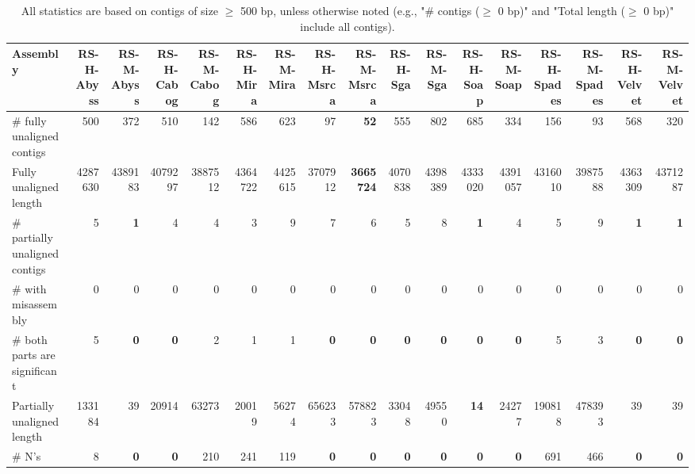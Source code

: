 \documentclass[12pt,a4paper]{article}
\begin{document}
\begin{table}[ht]
\begin{center}
\caption{All statistics are based on contigs of size $\geq$ 500 bp, unless otherwise noted (e.g., "\# contigs ($\geq$ 0 bp)" and "Total length ($\geq$ 0 bp)" include all contigs).}
\begin{tabular}{|l*{16}{|r}|}
\hline
Assembly & RS-H-Abyss & RS-M-Abyss & RS-H-Cabog & RS-M-Cabog & RS-H-Mira & RS-M-Mira & RS-H-Msrca & RS-M-Msrca & RS-H-Sga & RS-M-Sga & RS-H-Soap & RS-M-Soap & RS-H-Spades & RS-M-Spades & RS-H-Velvet & RS-M-Velvet \\ \hline
\# fully unaligned contigs & 500 & 372 & 510 & 142 & 586 & 623 & 97 & {\bf 52} & 555 & 802 & 685 & 334 & 156 & 93 & 568 & 320 \\ \hline
Fully unaligned length & 4287630 & 4389183 & 4079297 & 3887512 & 4364722 & 4425615 & 3707912 & {\bf 3665724} & 4070838 & 4398389 & 4333020 & 4391057 & 4316010 & 3987588 & 4363309 & 4371287 \\ \hline
\# partially unaligned contigs & 5 & {\bf 1} & 4 & 4 & 3 & 9 & 7 & 6 & 5 & 8 & {\bf 1} & 4 & 5 & 9 & {\bf 1} & {\bf 1} \\ \hline
\hspace{5mm}\# with misassembly & 0 & 0 & 0 & 0 & 0 & 0 & 0 & 0 & 0 & 0 & 0 & 0 & 0 & 0 & 0 & 0 \\ \hline
\hspace{5mm}\# both parts are significant & 5 & {\bf 0} & {\bf 0} & 2 & 1 & 1 & {\bf 0} & {\bf 0} & {\bf 0} & {\bf 0} & {\bf 0} & {\bf 0} & 5 & 3 & {\bf 0} & {\bf 0} \\ \hline
Partially unaligned length & 133184 & 39 & 20914 & 63273 & 20019 & 56274 & 656233 & 578823 & 33048 & 49550 & {\bf 14} & 24277 & 190818 & 478393 & 39 & 39 \\ \hline
\# N's & 8 & {\bf 0} & {\bf 0} & 210 & 241 & 119 & {\bf 0} & {\bf 0} & {\bf 0} & {\bf 0} & {\bf 0} & {\bf 0} & 691 & 466 & {\bf 0} & {\bf 0} \\ \hline
\end{tabular}
\end{center}
\end{table}
\end{document}
